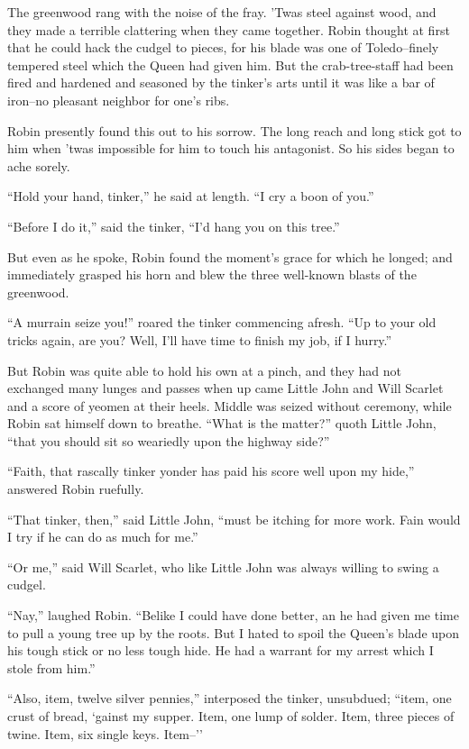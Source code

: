 The greenwood rang with the noise of the fray. 'Twas steel against wood,
and they made a terrible clattering when they came together. Robin
thought at first that he could hack the cudgel to pieces, for his blade
was one of Toledo--finely tempered steel which the Queen had given him.
But the crab-tree-staff had been fired and hardened and seasoned by the
tinker's arts until it was like a bar of iron--no pleasant neighbor for
one's ribs.

Robin presently found this out to his sorrow. The long reach and long
stick got to him when 'twas impossible for him to touch his antagonist.
So his sides began to ache sorely.

``Hold your hand, tinker,'' he said at length. ``I cry a boon of you.''

``Before I do it,'' said the tinker, ``I'd hang you on this tree.''

But even as he spoke, Robin found the moment's grace for which he
longed; and immediately grasped his horn and blew the three well-known
blasts of the greenwood.

``A murrain seize you!'' roared the tinker commencing afresh. ``Up to
your old tricks again, are you? Well, I'll have time to finish my job,
if I hurry.''

But Robin was quite able to hold his own at a pinch, and they had not
exchanged many lunges and passes when up came Little John and Will
Scarlet and a score of yeomen at their heels. Middle was seized without
ceremony, while Robin sat himself down to breathe. ``What is the
matter?'' quoth Little John, ``that you should sit so weariedly upon the
highway side?''

``Faith, that rascally tinker yonder has paid his score well upon my
hide,'' answered Robin ruefully.

``That tinker, then,'' said Little John, ``must be itching for more
work. Fain would I try if he can do as much for me.''

``Or me,'' said Will Scarlet, who like Little John was always willing to
swing a cudgel.

``Nay,'' laughed Robin. ``Belike I could have done better, an he had
given me time to pull a young tree up by the roots. But I hated to spoil
the Queen's blade upon his tough stick or no less tough hide. He had a
warrant for my arrest which I stole from him.''

``Also, item, twelve silver pennies,'' interposed the tinker, unsubdued;
``item, one crust of bread, `gainst my supper. Item, one lump of solder.
Item, three pieces of twine. Item, six single keys. Item--''

